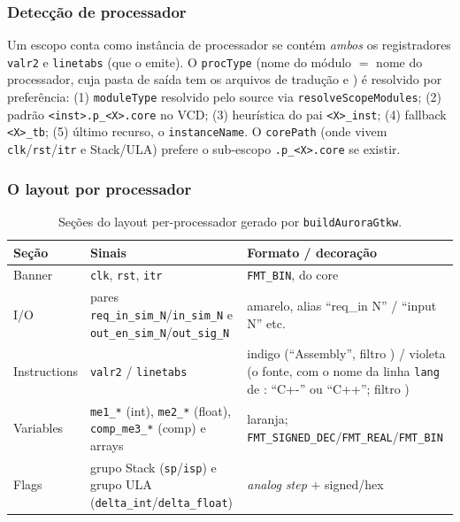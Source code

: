 \subsubsection{Detecção de processador}

Um escopo conta como instância de processador se contém \emph{ambos} os
registradores \lstinline|valr2| e \lstinline|linetabs| (que o 
emite). O \lstinline|procType| (nome do módulo $=$ nome do processador, cuja pasta de
saída  tem os arquivos de tradução
 e ) é resolvido por
preferência: (1) \lstinline|moduleType| resolvido pelo source via
\lstinline|resolveScopeModules|; (2) padrão \lstinline|<inst>.p_<X>.core| no
VCD; (3) heurística do pai \lstinline|<X>_inst|; (4) fallback
\lstinline|<X>_tb|; (5) último recurso, o \lstinline|instanceName|. O
\lstinline|corePath| (onde vivem \lstinline|clk|/\lstinline|rst|/\lstinline|itr|
e Stack/ULA) prefere o sub-escopo \lstinline|.p_<X>.core| se existir.

\subsubsection{O layout por processador}

\begin{table}[h]
\centering
\begin{tabularx}{\linewidth}{Y Y Z}
\toprule
\textbf{Seção} & \textbf{Sinais} & \textbf{Formato / decoração} \\
\midrule
Banner & \lstinline|clk|, \lstinline|rst|, \lstinline|itr| & \lstinline|FMT_BIN|, do core \\
I/O & pares \lstinline|req_in_sim_N|/\lstinline|in_sim_N| e \lstinline|out_en_sim_N|/\lstinline|out_sig_N| & amarelo, alias \enquote{req\_in N} / \enquote{input N} etc. \\
Instructions & \lstinline|valr2| / \lstinline|linetabs| & indigo (\enquote{Assembly}, filtro ) / violeta (o fonte, com o nome da linha \lstinline|lang| de : \enquote{C+-} ou \enquote{C++}; filtro ) \\
Variables & \lstinline|me1_*| (int), \lstinline|me2_*| (float), \lstinline|comp_me3_*| (comp) e arrays & laranja; \lstinline|FMT_SIGNED_DEC|/\lstinline|FMT_REAL|/\lstinline|FMT_BIN| \\
Flags & grupo Stack (\lstinline|sp|/\lstinline|isp|) e grupo ULA (\lstinline|delta_int|/\lstinline|delta_float|) & \emph{analog step} $+$ signed/hex \\
\bottomrule
\end{tabularx}
\caption{Seções do layout per-processador gerado por \lstinline|buildAuroraGtkw|.}
\label{tab:09-gtkw-secoes}
\end{table}

